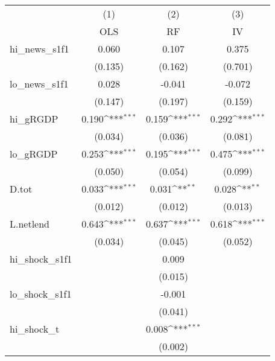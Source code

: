 {
\def\sym#1{\ifmmode^{#1}\else\(^{#1}\)\fi}
\begin{tabular}{l*{3}{c}}
\toprule
            &\multicolumn{1}{c}{(1)}&\multicolumn{1}{c}{(2)}&\multicolumn{1}{c}{(3)}\\
            &\multicolumn{1}{c}{OLS}&\multicolumn{1}{c}{RF}&\multicolumn{1}{c}{IV}\\
\midrule
hi\_news\_s1f1&       0.060         &       0.107         &       0.375         \\
            &     (0.135)         &     (0.162)         &     (0.701)         \\
\addlinespace
lo\_news\_s1f1&       0.028         &      -0.041         &      -0.072         \\
            &     (0.147)         &     (0.197)         &     (0.159)         \\
\addlinespace
hi\_gRGDP    &       0.190\sym{***}&       0.159\sym{***}&       0.292\sym{***}\\
            &     (0.034)         &     (0.036)         &     (0.081)         \\
\addlinespace
lo\_gRGDP    &       0.253\sym{***}&       0.195\sym{***}&       0.475\sym{***}\\
            &     (0.050)         &     (0.054)         &     (0.099)         \\
\addlinespace
D.tot       &       0.033\sym{***}&       0.031\sym{**} &       0.028\sym{**} \\
            &     (0.012)         &     (0.012)         &     (0.013)         \\
\addlinespace
L.netlend   &       0.643\sym{***}&       0.637\sym{***}&       0.618\sym{***}\\
            &     (0.034)         &     (0.045)         &     (0.052)         \\
\addlinespace
hi\_shock\_s1f1&                     &       0.009         &                     \\
            &                     &     (0.015)         &                     \\
\addlinespace
lo\_shock\_s1f1&                     &      -0.001         &                     \\
            &                     &     (0.041)         &                     \\
\addlinespace
hi\_shock\_t  &                     &       0.008\sym{***}&                     \\
            &                     &     (0.002)         &                     \\

\end{tabular}}
